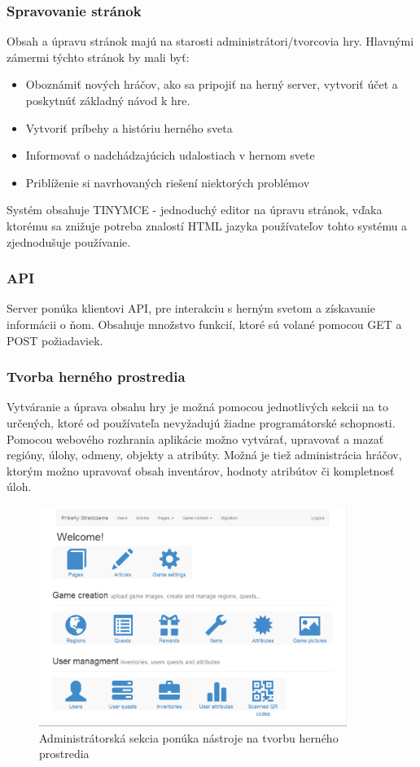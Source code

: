 \subsubsection{Spravovanie stránok}
Obsah a úpravu stránok majú na starosti administrátori/tvorcovia hry. Hlavnými zámermi týchto stránok by mali byť:
 \begin{itemize}
  \item Oboznámiť nových hráčov, ako sa pripojiť na herný server, vytvoriť účet a poskytnúť základný návod k hre.
  \item Vytvoriť príbehy a históriu herného sveta 
  \item Informovať o nadchádzajúcich udalostiach v hernom svete
  \item Priblíženie si navrhovaných riešení niektorých problémov
\end{itemize}
Systém obsahuje TINYMCE - jednoduchý editor na úpravu stránok, vďaka ktorému sa znižuje potreba znalostí HTML jazyka používateľov tohto systému a zjednodušuje používanie.

\subsubsection{API}
Server ponúka klientovi API, pre interakciu s herným svetom a získavanie informácii o ňom. Obsahuje množstvo funkcií, ktoré sú volané pomocou GET a POST požiadaviek.

\subsubsection{Tvorba herného prostredia}
Vytváranie a úprava obsahu hry je možná pomocou jednotlivých sekcii na to určených, ktoré od používateľa nevyžadujú žiadne programátorské schopnosti. Pomocou webového rozhrania aplikácie možno vytvárať, upravovať a mazať regióny, úlohy, odmeny, objekty a atribúty. Možná je tiež administrácia hráčov, ktorým možno upravovať obsah inventárov, hodnoty atribútov či kompletnosť úloh.
\begin{figure}[ht!]
  \centering
  \includegraphics[width=10cm]{mainmatter/imgs/server_menu.png}
  \caption{Administrátorská sekcia ponúka nástroje na tvorbu herného prostredia}
  \label{fig:server_menu}
\end{figure}

